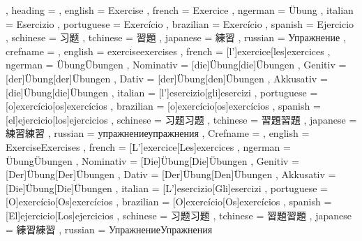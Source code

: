   {
    , heading =   {
                    , english     = Exercise
                    , french      = Exercice
                    , ngerman     = Übung
                    , italian     = Esercizio
                    , portuguese  = Exercício
                    , brazilian   = Exercício
                    , spanish     = Ejercicio
                    , schinese    = 习题
                    , tchinese    = 習題
                    , japanese    = 練習
                    , russian     = Упражнение
                  }
    , crefname =  {
                    , english     = {exercise}{exercises}
                    , french      = [l']{exercice}[les]{exercices}
                    , ngerman     = { {Übung}{Übungen}
                                      , Nominativ = [die]{Übung}[die]{Übungen}
                                      , Genitiv   = [der]{Übung}[der]{Übungen}
                                      , Dativ     = [der]{Übung}[den]{Übungen}
                                      , Akkusativ = [die]{Übung}[die]{Übungen}
                                    }
                    , italian     = [l']{esercizio}[gli]{esercizi}
                    , portuguese  = [o]{exercício}[os]{exercícios}
                    , brazilian   = [o]{exercício}[os]{exercícios}
                    , spanish     = [el]{ejercicio}[los]{ejercicios}
                    , schinese    = {习题}{习题}
                    , tchinese    = {習題}{習題}
                    , japanese    = {練習}{練習}
                    , russian     = {упражнение}{упражнения}
                  }
    , Crefname =  {
                    , english     = {Exercise}{Exercises}
                    , french      = [L']{exercice}[Les]{exercices}
                    , ngerman     = { {Übung}{Übungen}
                                      , Nominativ = [Die]{Übung}[Die]{Übungen}
                                      , Genitiv   = [Der]{Übung}[Der]{Übungen}
                                      , Dativ     = [Der]{Übung}[Den]{Übungen}
                                      , Akkusativ = [Die]{Übung}[Die]{Übungen}
                                    }
                    , italian     = [L']{esercizio}[Gli]{esercizi}
                    , portuguese  = [O]{exercício}[Os]{exercícios}
                    , brazilian   = [O]{exercício}[Os]{exercícios}
                    , spanish     = [El]{ejercicio}[Los]{ejercicios}
                    , schinese    = {习题}{习题}
                    , tchinese    = {習題}{習題}
                    , japanese    = {練習}{練習}
                    , russian     = {Упражнение}{Упражнения}
                  }
  }

